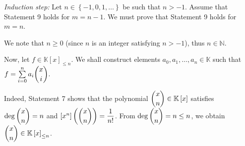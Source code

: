 \documentclass[paper=a4, fontsize=12pt]{scrartcl}%
\let\sumnonlimits\sum
\renewcommand{\sum}{\sumnonlimits\limits}
\theoremstyle{plainsl}
\theoremstyle{definition}
\theoremstyle{remark}
\begin{document}
\textit{Induction step:} Let $n\in\left\{  -1,0,1,\ldots\right\}  $ be such
that $n>-1$. Assume that Statement 9 holds for $m=n-1$. We must prove that
Statement 9 holds for $m=n$.

We note that $n\geq0$ (since $n$ is an integer satisfying $n>-1$), thus
$n\in\mathbb{N}$.

Now, let $f\in\mathbb{K}\left[  x\right]  _{\leq n}$. We shall construct
elements $a_{0},a_{1},\ldots,a_{n}\in\mathbb{K}$ such that $f=\sum_{i=0}%
^{n}a_{i}\dbinom{x}{i}$.

Indeed, Statement 7 shows that the polynomial $\dbinom{x}{n}\in\mathbb{K}%
\left[  x\right]  $ satisfies $\deg\dbinom{x}{n}=n$ and $\left[  x^{n}\right]
\left(  \dbinom{x}{n}\right)  =\dfrac{1}{n!}$. From $\deg\dbinom{x}{n}=n\leq
n$, we obtain $\dbinom{x}{n}\in\mathbb{K}\left[  x\right]  _{\leq n}$.
\end{document}
